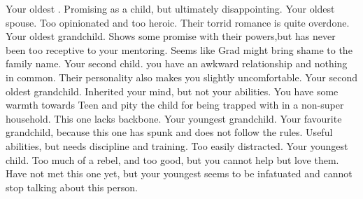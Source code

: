\documentclass[char]{LRSguildcamp1}
\begin{document}
\begin{contacts}
	\contact{\cOldest{}} Your oldest \cOldest{\offspring}. Promising as a child, but ultimately disappointing. 
	\contact{\cOS{}}  Your oldest \cOldest{\offspring} spouse. Too opinionated and too heroic. Their torrid romance is quite overdone. 
	\contact{\cGrad{}} Your oldest grandchild. Shows some promise with their powers,but has never been too receptive to your mentoring. Seems like Grad might bring shame to the family name.  
	\contact{\cArchitect{}}  Your second child. you have an awkward relationship and nothing in common. Their personality also makes you slightly uncomfortable. 
	\contact{\cTeen{}} Your second oldest grandchild. Inherited your mind, but not your abilities. You have some warmth towards Teen and pity the child for being trapped with in a non-super household. This one lacks backbone. 
	\contact{\cTween{}} Your youngest grandchild. Your favourite grandchild, because this one has spunk and does not follow the rules. Useful abilities, but needs discipline and training. Too easily distracted. 
	\contact{\cYoungest{}} Your youngest child. Too much of a rebel, and too good, but you cannot help but love them. 
	\contact{\cYS{}} Have not met this one yet, but your youngest seems to be infatuated and cannot stop talking about this person. 
	
\end{contacts}
\end{document}
